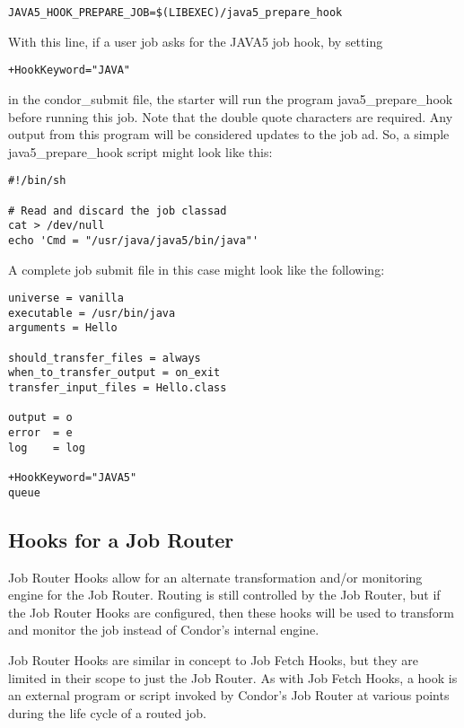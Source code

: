 \begin{verbatim}
JAVA5_HOOK_PREPARE_JOB=$(LIBEXEC)/java5_prepare_hook
\end{verbatim}

With this line, if a user job asks for the JAVA5 job hook, by setting

\begin{verbatim}
+HookKeyword="JAVA"
\end{verbatim}

in the condor\_submit file, the starter will run the program java5\_prepare\_hook 
before running this job.  Note that the double quote characters are required.
Any output from this program will be considered updates to the job ad.  
So, a simple java5\_prepare\_hook script might look like this:

\begin{verbatim}
#!/bin/sh

# Read and discard the job classad
cat > /dev/null
echo 'Cmd = "/usr/java/java5/bin/java"'
\end{verbatim}

A complete job submit file in this case might look like the following:
\begin{verbatim}
universe = vanilla
executable = /usr/bin/java
arguments = Hello

should_transfer_files = always
when_to_transfer_output = on_exit
transfer_input_files = Hello.class

output = o
error  = e
log    = log

+HookKeyword="JAVA5"
queue

\end{verbatim}

\subsection{\label{sec:job-hooks-JR-overview}
Hooks for a Job Router}

Job Router Hooks allow for an alternate transformation and/or 
monitoring engine for the Job Router.
Routing is still controlled by the Job Router,
but if the Job Router Hooks are configured,
then these hooks will be used to transform
and monitor the job instead of Condor's internal engine.

Job Router Hooks are similar in concept to Job Fetch Hooks,
but they are limited in their scope to just the Job Router.
As with Job Fetch Hooks,
a hook is an external program or script invoked by Condor's Job Router
at various points during the life cycle of a routed job.

